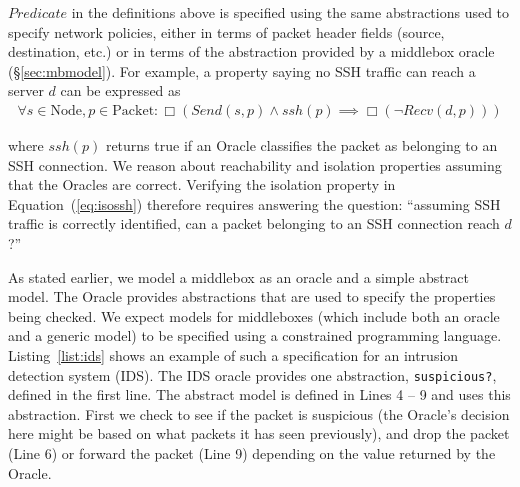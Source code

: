 $Predicate$ in the definitions above is specified using the same abstractions used to specify network policies, \ie either in terms of packet
header fields (source, destination, etc.) or in terms of the abstraction provided by a middlebox oracle (\S\ref{sec:mbmodel}). For example, a property
saying no SSH traffic can reach a server $d$ can be expressed as
\begin{align}
\forall s\in \text{Node}, p\in \text{Packet}: \Box (Send(s, p) \land ssh(p) \implies \Box(\neg Recv(d, p))) \label{eq:isossh}
\end{align}

where $ssh(p)$ returns true if an Oracle classifies the packet as belonging to an SSH connection.
We reason about reachability and isolation properties assuming that the Oracles are correct.
Verifying the isolation property in Equation~(\ref{eq:isossh}) therefore requires answering the question:
``assuming SSH traffic is correctly identified, can a packet belonging to an SSH connection reach $d$?''


As stated earlier, we model a middlebox as an oracle and a simple abstract model. The Oracle provides abstractions that are used to specify the
properties being checked. We expect models for middleboxes (which include both an oracle and a generic model) to be specified
using a constrained programming language. Listing~\ref{list:ids} shows an example of such a specification
for an intrusion detection system (IDS). The IDS oracle provides one abstraction, \texttt{suspicious?}, defined in the first line. The abstract model is
defined in Lines 4 -- 9 and uses this abstraction. First we check to see if the packet is suspicious (the Oracle's decision here might be based on what
packets it has seen previously), and  drop the packet (Line 6) or forward the packet (Line 9) depending on the value returned by the Oracle.


